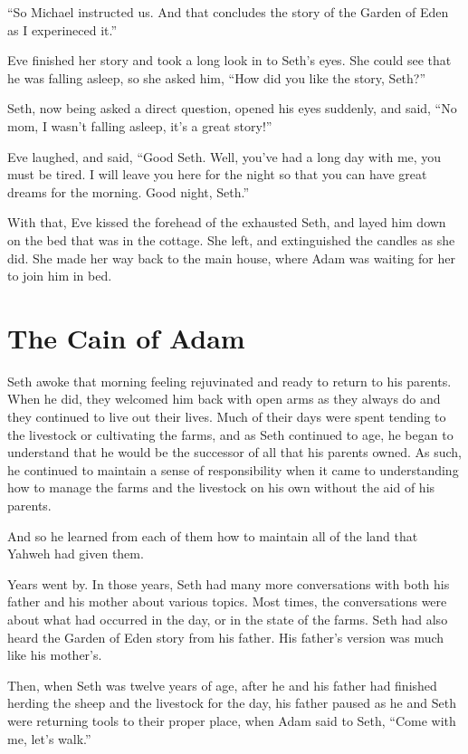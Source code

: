\documentclass[12pt,twoside,titlepage]{report}
\begin{document}
``So Michael instructed us. And that concludes the story of the Garden
of Eden as I experineced it.''

Eve finished her story and took a long look in to Seth's eyes. She could
see that he was falling asleep, so she asked him, ``How did you like the
story, Seth?''

Seth, now being asked a direct question, opened his eyes suddenly, and
said, ``No mom, I wasn't falling asleep, it's a great story!''

Eve laughed, and said, ``Good Seth. Well, you've had a long day with me,
you must be tired. I will leave you here for the night so that you can
have great dreams for the morning. Good night, Seth.''

With that, Eve kissed the forehead of the exhausted Seth, and layed him
down on the bed that was in the cottage. She left, and extinguished the
candles as she did. She made her way back to the main house, where Adam
was waiting for her to join him in bed.

\hypertarget{the-cain-of-adam}{%
\chapter{The Cain of Adam}\label{the-cain-of-adam}}

Seth awoke that morning feeling rejuvinated and ready to return to his
parents. When he did, they welcomed him back with open arms as they
always do and they continued to live out their lives. Much of their days
were spent tending to the livestock or cultivating the farms, and as
Seth continued to age, he began to understand that he would be the
successor of all that his parents owned. As such, he continued to
maintain a sense of responsibility when it came to understanding how to
manage the farms and the livestock on his own without the aid of his
parents.

And so he learned from each of them how to maintain all of the land that
Yahweh had given them.

Years went by. In those years, Seth had many more conversations with
both his father and his mother about various topics. Most times, the
conversations were about what had occurred in the day, or in the state
of the farms. Seth had also heard the Garden of Eden story from his
father. His father's version was much like his mother's.

Then, when Seth was twelve years of age, after he and his father had
finished herding the sheep and the livestock for the day, his father
paused as he and Seth were returning tools to their proper place, when
Adam said to Seth, ``Come with me, let's walk.''
\end{document}
